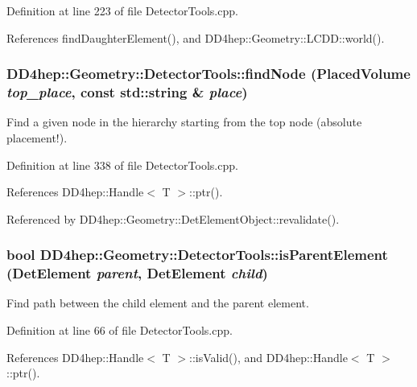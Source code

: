 Definition at line 223 of file DetectorTools.cpp.

References findDaughterElement(), and DD4hep::Geometry::LCDD::world().\hypertarget{namespace_d_d4hep_1_1_geometry_1_1_detector_tools_a82d2f181b2755d1fbd749c30b7dd21c1}{
\subsubsection[{findNode}]{ DD4hep::Geometry::DetectorTools::findNode ({\bf PlacedVolume} {\em top\_\-place}, \/  const std::string \& {\em place})}}
\label{namespace_d_d4hep_1_1_geometry_1_1_detector_tools_a82d2f181b2755d1fbd749c30b7dd21c1}


Find a given node in the hierarchy starting from the top node (absolute placement!). 

Definition at line 338 of file DetectorTools.cpp.

References DD4hep::Handle$<$ T $>$::ptr().

Referenced by DD4hep::Geometry::DetElementObject::revalidate().\hypertarget{namespace_d_d4hep_1_1_geometry_1_1_detector_tools_a9e02ef062540b4e9c0d284f50106f203}{
\subsubsection[{isParentElement}]{\setlength{\rightskip}{0pt plus 5cm}bool DD4hep::Geometry::DetectorTools::isParentElement ({\bf DetElement} {\em parent}, \/  {\bf DetElement} {\em child})}}
\label{namespace_d_d4hep_1_1_geometry_1_1_detector_tools_a9e02ef062540b4e9c0d284f50106f203}


Find path between the child element and the parent element. 

Definition at line 66 of file DetectorTools.cpp.

References DD4hep::Handle$<$ T $>$::isValid(), and DD4hep::Handle$<$ T $>$::ptr().

